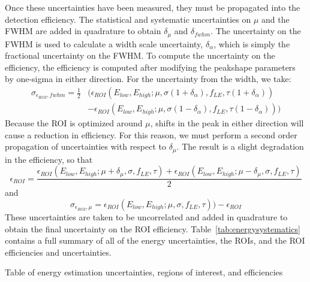 \documentclass[/main.tex]{subfiles}
\begin{document}
Once these uncertainties have been measured, they must be propagated into the detection efficiency.
The statistical and systematic uncertainties on $\mu$ and the FWHM are added in quadrature to obtain $\delta_\mu$ and $\delta_{fwhm}$.
The uncertainty on the FWHM is used to calculate a width scale uncertainty, $\delta_\alpha$, which is simply the fractional uncertainty on the FWHM.
To compute the uncertainty on the efficiency, the efficiency is computed after modifying the peakshape parameters by one-sigma in either direction.
For the uncertainty from the width, we take:
\begin{equation}
  \begin{aligned}
    \sigma_{\epsilon_{ROI},fwhm} = \frac{1}{2}&\big(\epsilon_{ROI}(E_{low}, E_{high}; \mu, \sigma(1+\delta_\alpha), f_{LE}, \tau(1+\delta_\alpha)) \\&- \epsilon_{ROI}(E_{low}, E_{high}; \mu, \sigma(1-\delta_\alpha), f_{LE}, \tau(1-\delta_\alpha))\big)
  \end{aligned}
\end{equation}
Because the ROI is optimized around $\mu$, shifts in the peak in either direction will cause a reduction in efficiency.
For this reason, we must perform a second order propagation of uncertainties with respect to $\delta_\mu$.
The result is a slight degradation in the efficiency, so that
\begin{equation}
  \epsilon_{ROI} =  \frac{\epsilon_{ROI}(E_{low}, E_{high}; \mu + \delta_\mu, \sigma, f_{LE}, \tau) + \epsilon_{ROI}(E_{low}, E_{high}; \mu - \delta_\mu, \sigma, f_{LE}, \tau)}{2}
\end{equation}
and
\begin{equation}
  \sigma_{\epsilon_{ROI},\mu} = \epsilon_{ROI}(E_{low}, E_{high}; \mu, \sigma, f_{LE}, \tau)) - \epsilon_{ROI}
\end{equation}
These uncertainties are taken to be uncorrelated and added in quadrature to obtain the final uncertainty on the ROI efficiency.
Table~\ref{tab:energysystematics} contains a full summary of all of the energy uncertainties, the ROIs, and the ROI efficiencies and uncertainties.
\begin{table}
  \caption[Energy systematics]{ \label{tab:energysystematics}
    Table of energy estimation uncertainties, regions of interest, and efficiencies
  }
  \resizebox{\textwidth}{!}{%
   }
\end{table}
\end{document}
